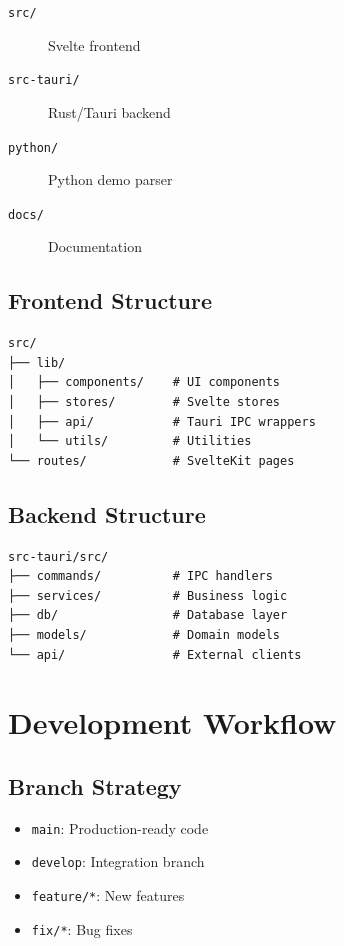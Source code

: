 \begin{description}
    \item[\texttt{src/}] Svelte frontend
    \item[\texttt{src-tauri/}] Rust/Tauri backend
    \item[\texttt{python/}] Python demo parser
    \item[\texttt{docs/}] Documentation
\end{description}

\subsection{Frontend Structure}

\begin{lstlisting}
src/
├── lib/
│   ├── components/    # UI components
│   ├── stores/        # Svelte stores
│   ├── api/           # Tauri IPC wrappers
│   └── utils/         # Utilities
└── routes/            # SvelteKit pages
\end{lstlisting}

\subsection{Backend Structure}

\begin{lstlisting}
src-tauri/src/
├── commands/          # IPC handlers
├── services/          # Business logic
├── db/                # Database layer
├── models/            # Domain models
└── api/               # External clients
\end{lstlisting}

\section{Development Workflow}

\subsection{Branch Strategy}

\begin{itemize}
    \item \texttt{main}: Production-ready code
    \item \texttt{develop}: Integration branch
    \item \texttt{feature/*}: New features
    \item \texttt{fix/*}: Bug fixes
\end{itemize}

